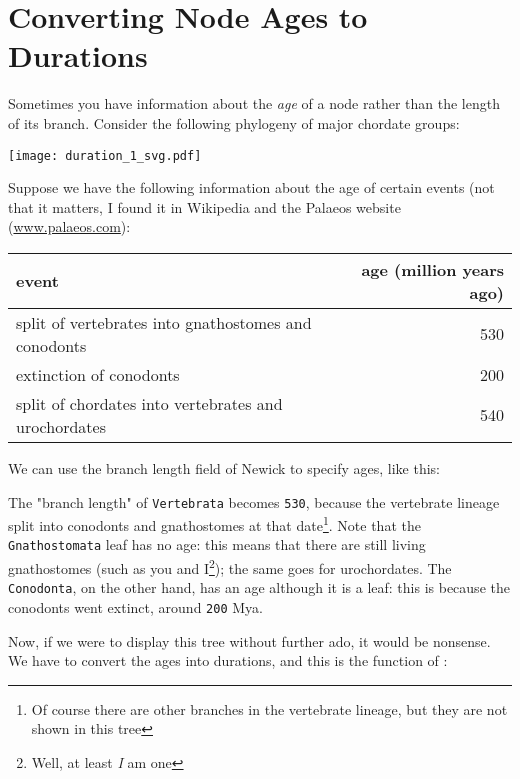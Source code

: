 \section{Converting
Node Ages to Durations}
\label{sct_duration}

Sometimes you have information about the \textit{age} of a node rather than the
length of its branch. Consider the following phylogeny of major chordate groups:

\begin{center}
 \texttt{[image: duration\_1\_svg.pdf]}
\end{center}

Suppose we have the following information about the age of certain events (not
that it matters, I found it in Wikipedia and the Palaeos website
(\url{www.palaeos.com}):

\smallskip
\begin{tabular}{lr}
\textbf{event} & \textbf{age} (million years ago)\\
\hline
split of vertebrates into gnathostomes and conodonts & 530 \\
extinction of conodonts & 200 \\
split of chordates into vertebrates and urochordates & 540 \\
\end{tabular}
\smallskip

\noindent{}We can use the branch length field of Newick to specify ages, like
this:

\begin{samepage}


\end{samepage}

\noindent{}The "branch length" of \texttt{Vertebrata} becomes \texttt{530},
because the vertebrate lineage split into conodonts and gnathostomes at that
date\footnote{Of course there are other branches in the vertebrate lineage, but
they are not shown in this tree}. Note that the \texttt{Gnathostomata} leaf has
no age: this means that there are still living gnathostomes (such as you and
I\footnote{Well, at least \textit{I} am one}); the same goes for urochordates.
The \texttt{Conodonta}, on the other hand, has an age although it is a leaf:
this is because the conodonts went extinct, around \texttt{200} Mya.

Now, if we were to display this tree without further ado, it would be nonsense.
We have to convert the ages into durations, and this is the function of
\duration{}:

